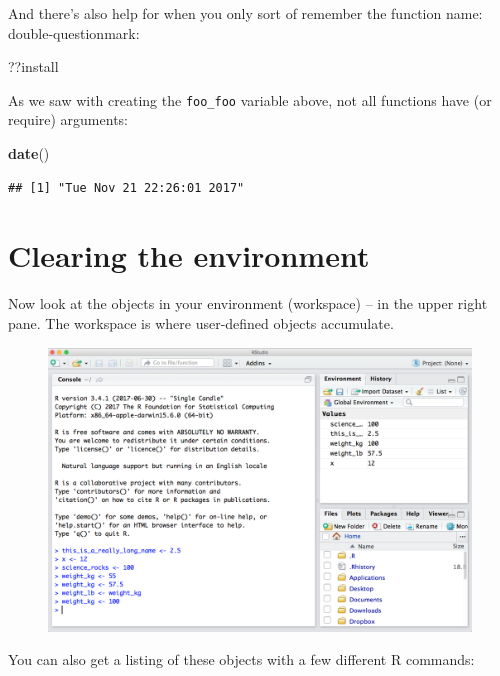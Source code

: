 \documentclass[]{book}
\newenvironment{Shaded}{\begin{snugshade}}{\end{snugshade}}
\newcommand{\KeywordTok}[1]{\textcolor[rgb]{0.13,0.29,0.53}{\textbf{#1}}}
\newcommand{\NormalTok}[1]{#1}
\theoremstyle{definition}
\theoremstyle{definition}
\theoremstyle{definition}
\theoremstyle{remark}
\begin{document}
And there's also help for when you only sort of remember the function
name: double-questionmark:

\begin{Shaded}
\begin{Highlighting}[]
\NormalTok{??install }
\end{Highlighting}
\end{Shaded}

As we saw with creating the \texttt{foo\_foo} variable above, not all
functions have (or require) arguments:

\begin{Shaded}
\begin{Highlighting}[]
\KeywordTok{date}\NormalTok{()}
\end{Highlighting}
\end{Shaded}

\begin{verbatim}
## [1] "Tue Nov 21 22:26:01 2017"
\end{verbatim}

\section{Clearing the environment}\label{clearing-the-environment}

Now look at the objects in your environment (workspace) -- in the upper
right pane. The workspace is where user-defined objects accumulate.

\begin{figure}
\centering
\includegraphics{img/RStudio_IDE_env.png}
\caption{}
\end{figure}

You can also get a listing of these objects with a few different R
commands:
\end{document}

